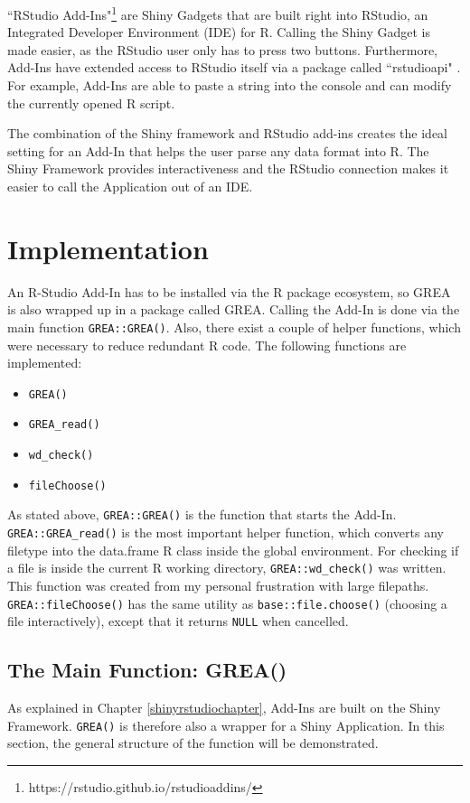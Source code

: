 \documentclass[12pt]{article} %
\newcommand{\li}{\lstinline}
\begin{document}
``RStudio Add-Ins"\footnote{https://rstudio.github.io/rstudioaddins/} are Shiny Gadgets that are built right into RStudio, an Integrated Developer Environment (IDE) for R. Calling the Shiny Gadget is made easier, as the RStudio user only has to press two buttons. Furthermore, Add-Ins have extended access to RStudio itself via a package called ``rstudioapi" \cite[Wickham and Allaire 2016]{w7}. For example, Add-Ins are able to paste a string into the console and can modify the currently opened R script.

The combination of the Shiny framework and RStudio add-ins creates the ideal setting for an Add-In that helps the user parse any data format into R. The Shiny Framework provides interactiveness and the RStudio connection makes it easier to call the Application out of an IDE.

\section{Implementation}

An R-Studio Add-In has to be installed via the R package ecosystem, so GREA is also wrapped up in a package called GREA. Calling the Add-In is done via the main function \li{GREA::GREA()}. Also, there exist a couple of helper functions, which were necessary to reduce redundant R code.
The following functions are implemented:

\begin{itemize}
\item \li{GREA()}
\item \li{GREA_read()}
\item \li{wd_check()}
\item \li{fileChoose()}
\end{itemize}

As stated above, \li{GREA::GREA()} is the function that starts the Add-In. \li{GREA::GREA_read()} is the most important helper function, which converts any filetype into the data.frame R class inside the global environment. For checking if a file is inside the current R working directory, \li{GREA::wd_check()} was written. This function was created from my personal frustration with large filepaths. \li{GREA::fileChoose()} has the same utility as \li{base::file.choose()} (choosing a file interactively), except that it returns \li{NULL} when cancelled.

\subsection{The Main Function: \textrm{GREA()}}
\label{mainfunctionchapter}
As explained in Chapter \ref{shinyrstudiochapter}, Add-Ins are built on the Shiny Framework. \li{GREA()} is therefore also a wrapper for a Shiny Application. In this section, the general structure of the function will be demonstrated.
\end{document}
